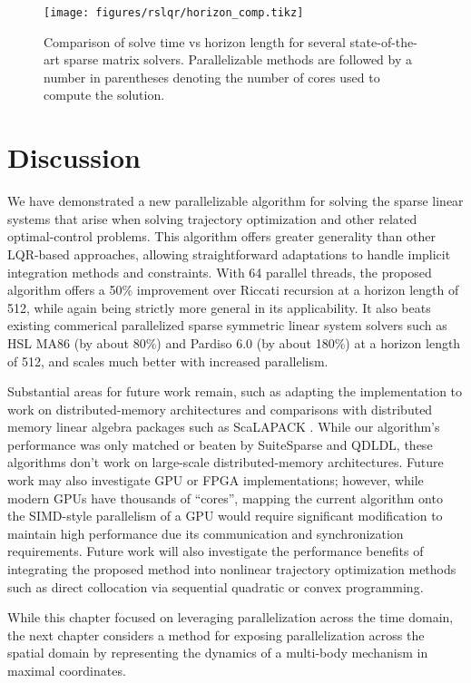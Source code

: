 \documentclass[../root.tex]{subfiles}
\newcommand{\0}{{\transparent{0} \resizebox{\mycellheight}{\mycellheight}{0}}}
\begin{document}
\begin{figure}
    \centering 
    \texttt{[image: figures/rslqr/horizon\_comp.tikz]}
    \caption{Comparison of solve time vs horizon length for several state-of-the-art 
    sparse matrix solvers. Parallelizable methods are followed by a number in parentheses 
    denoting the number of cores used to compute the solution. }
    \label{fig:horizon_comp}
\end{figure}

\section{Discussion} \label{sec:rslqr_conclusion}

We have demonstrated a new parallelizable algorithm for solving the sparse
linear systems that arise when solving trajectory optimization and other related
optimal-control problems.  This algorithm offers greater generality than other
LQR-based approaches, allowing straightforward adaptations to handle implicit
integration methods and constraints. With 64 parallel threads, the proposed
algorithm offers a 50\% improvement over Riccati recursion at a horizon length
of 512, while again being strictly more general in its applicability. It also
beats existing commerical parallelized sparse symmetric linear system solvers
such as HSL MA86 (by about 80\%) and Pardiso 6.0 (by about 180\%) at a horizon
length of 512, and scales much better with increased parallelism. 

Substantial areas for future work remain, such as adapting the implementation to work on
distributed-memory architectures and comparisons with distributed memory linear algebra
packages such as ScaLAPACK \cite{tennessee_ScaLAPACK_}. While our algorithm's performance was only
matched or beaten by SuiteSparse and QDLDL, these algorithms don't work on large-scale
distributed-memory architectures.  Future work may also investigate GPU or FPGA 
implementations; however, while modern GPUs have thousands of ``cores'', mapping the current
algorithm onto the SIMD-style parallelism of a GPU would require significant modification to maintain high performance due its communication and
synchronization requirements.  Future work will also investigate the performance benefits of
integrating the proposed method into nonlinear trajectory optimization methods such as 
direct collocation via sequential quadratic or convex programming. %

While this chapter focused on leveraging parallelization across the time domain, the next
chapter considers a method for exposing parallelization across the spatial domain by 
representing the dynamics of a multi-body mechanism in maximal coordinates.

\end{document}
